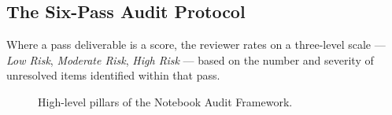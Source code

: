 \documentclass[11pt, a4paper]{article}
\begin{document}
\subsection*{The Six-Pass Audit Protocol}

Where a pass deliverable is a score, the reviewer rates on a three-level scale
— \textit{Low Risk}, \textit{Moderate Risk}, \textit{High Risk} — based on
the number and severity of unresolved items identified within that pass.

\begin{figure}[ht]
  \centering
  \caption{High-level pillars of the Notebook Audit Framework.}
  \label{fig:audit-tree}
\end{figure}
\end{document}
